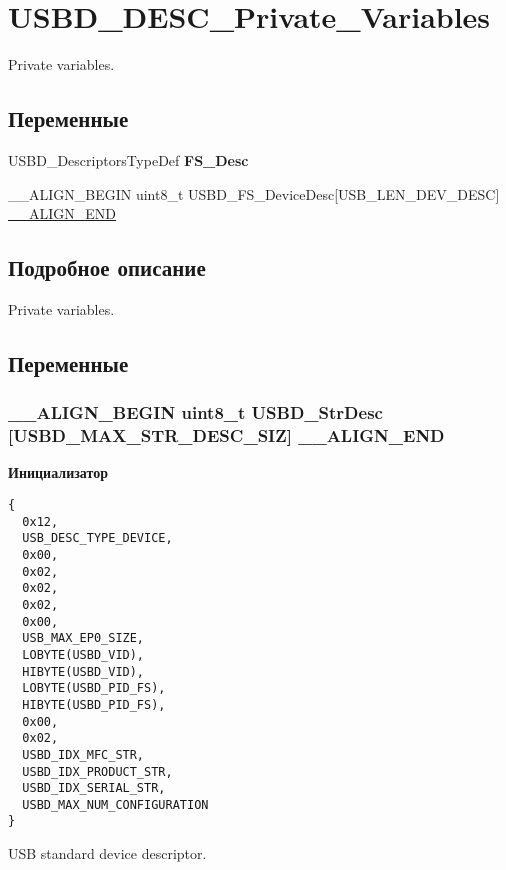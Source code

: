 \hypertarget{group___u_s_b_d___d_e_s_c___private___variables}{
\section{USBD\_\-DESC\_\-Private\_\-Variables}
\label{group___u_s_b_d___d_e_s_c___private___variables}
}
Private variables.  


\subsection*{Переменные}
\begin{CompactItemize}
\item 
USBD\_\-DescriptorsTypeDef \textbf{FS\_\-Desc}
\item 
\_\-\_\-ALIGN\_\-BEGIN uint8\_\-t USBD\_\-FS\_\-DeviceDesc\mbox{[}USB\_\-LEN\_\-DEV\_\-DESC\mbox{]} \hyperlink{group___u_s_b_d___d_e_s_c___private___variables_g89686ff64ce14e5466980830aea57e07}{\_\-\_\-ALIGN\_\-END}
\end{CompactItemize}


\subsection{Подробное описание}
Private variables. 

\subsection{Переменные}
\hypertarget{group___u_s_b_d___d_e_s_c___private___variables_g89686ff64ce14e5466980830aea57e07}{
\subsubsection[{\_\-\_\-ALIGN\_\-END}]{\setlength{\rightskip}{0pt plus 5cm}\_\-\_\-ALIGN\_\-BEGIN uint8\_\-t USBD\_\-StrDesc \mbox{[}USBD\_\-MAX\_\-STR\_\-DESC\_\-SIZ\mbox{]} {\bf \_\-\_\-ALIGN\_\-END}}}
\label{group___u_s_b_d___d_e_s_c___private___variables_g89686ff64ce14e5466980830aea57e07}


\textbf{Инициализатор}

\begin{Code}\begin{verbatim}
{
  0x12,                       
  USB_DESC_TYPE_DEVICE,       
  0x00,                       
  0x02,
  0x02,                       
  0x02,                       
  0x00,                       
  USB_MAX_EP0_SIZE,           
  LOBYTE(USBD_VID),           
  HIBYTE(USBD_VID),           
  LOBYTE(USBD_PID_FS),        
  HIBYTE(USBD_PID_FS),        
  0x00,                       
  0x02,
  USBD_IDX_MFC_STR,           
  USBD_IDX_PRODUCT_STR,       
  USBD_IDX_SERIAL_STR,        
  USBD_MAX_NUM_CONFIGURATION  
}
\end{verbatim}
\end{Code}
USB standard device descriptor.

